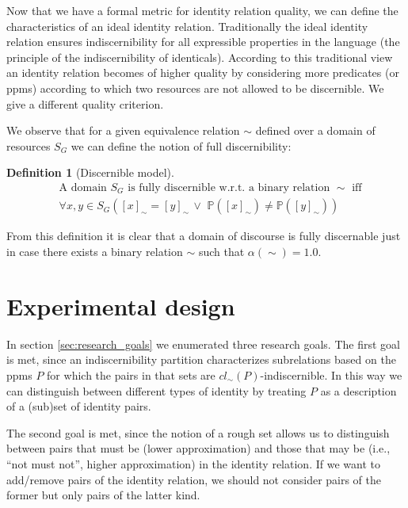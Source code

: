 \documentclass[letterpaper]{article}
\newtheorem{definition}{Definition}
\begin{document}
Now that we have a formal metric for identity relation quality,
  we can define the characteristics of an ideal identity relation.
Traditionally the ideal identity relation ensures indiscernibility
  for all expressible properties in the language
  (the principle of the indiscernibility of identicals).
According to this traditional view an identity relation becomes of
  higher quality by considering more predicates (or ppms)
  according to which two resources are not allowed to be discernible.
We give a different quality criterion.

We observe that for a given equivalence relation $\sim$
  defined over a domain of resources $S_G$ we can define the notion of
  full discernibility:

\small
\begin{definition}[Discernible model]
\label{def:fully_discernible}
\begin{align}
& \text{A domain $S_G$ is fully discernible w.r.t. a binary relation $\sim$ iff}
\nonumber
\\
 & \forall x,y \in S_G (
    [x]_{\sim}=[y]_{\sim}
  \,\lor\,\,
    \mathbb{P}([x]_{\sim}) \neq \mathbb{P}([y]_{\sim})
  )
\end{align}
\end{definition}
\normalsize

\noindent From this definition it is clear that a domain of discourse
  is fully discernable just in case there exists a binary relation $\sim$
  such that \mbox{$\alpha(\sim) = 1.0$}.

\section{Experimental design}
\label{sec:experimental_design}

In section \ref{sec:research_goals} we enumerated three research goals.
The first goal is met, since an indiscernibility partition characterizes
  subrelations based on the ppms $P$ for which the pairs in that sets
  are $cl_{\sim}(P)$-indiscernible.
In this way we can distinguish between different types of identity
  by treating $P$ as a description of a (sub)set of identity pairs.

The second goal is met, since the notion of a rough set allows us to
  distinguish between pairs that must be (lower approximation)
  and those that may be (i.e., ``not must not'', higher approximation)
  in the identity relation.
If we want to add/remove pairs of the identity relation,
  we should not consider pairs of the former but only pairs of
  the latter kind.
\end{document}
